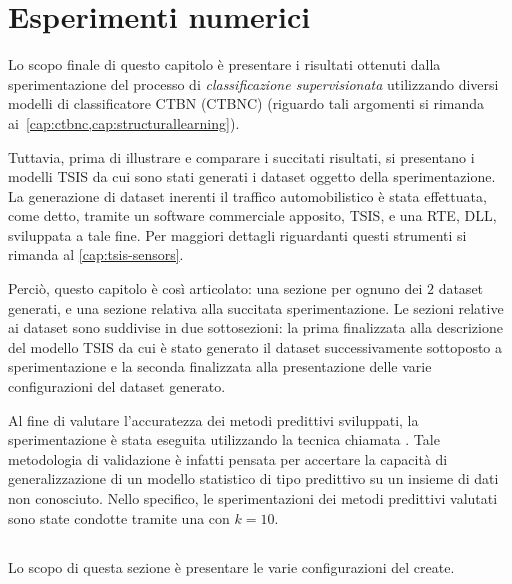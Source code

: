
\chapter{Esperimenti numerici}\label{cap:esperimenti}
Lo scopo finale di questo capitolo è presentare i risultati ottenuti dalla sperimentazione del processo di \emph{classificazione supervisionata} utilizzando diversi modelli di classificatore \acs{CTBN} (\acs{CTBNC}) (riguardo tali argomenti si rimanda ai~\vref{cap:ctbnc,cap:structurallearning}).

Tuttavia, prima di illustrare e comparare i succitati risultati, si presentano i modelli \acs{TSIS} da cui sono stati generati i dataset oggetto della sperimentazione. La generazione di dataset inerenti il traffico automobilistico è stata effettuata, come detto, tramite un software commerciale apposito, \acs{TSIS}, e una \acl{RTE},  \acs{DLL}, sviluppata a tale fine. Per maggiori dettagli riguardanti questi strumenti si rimanda al \vref{cap:tsis-sensors}.

Perciò, questo capitolo è così articolato: una sezione per ognuno dei $2$ dataset generati, e una sezione relativa alla succitata sperimentazione. Le sezioni relative ai dataset sono suddivise in due sottosezioni: la prima finalizzata alla descrizione del modello \acs{TSIS} da cui è stato generato il dataset successivamente sottoposto a sperimentazione e la seconda finalizzata alla presentazione delle varie configurazioni del dataset generato.

Al fine di valutare l'accuratezza dei metodi predittivi sviluppati, la sperimentazione è stata eseguita utilizzando la tecnica chiamata \emph{}. Tale metodologia di validazione è infatti pensata per accertare la capacità di generalizzazione di un modello statistico di tipo predittivo su un insieme di dati non conosciuto. Nello specifico, le sperimentazioni dei metodi predittivi valutati sono state condotte tramite una \emph{} \emph{} con $k=10$.

\section{}\label{sec:dataset-1}
Lo scopo di questa sezione è presentare le varie configurazioni del  create.

